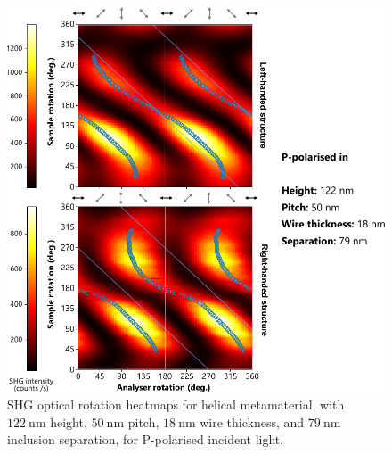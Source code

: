 \begin{figure}[htb!]	
    \centering	
    \includegraphics[scale=1]{./figures/results/OAinPlanarNanohelices/8_p_data.pdf}

    \caption{\label{fig:results:OAinPlanarNanohelices:8_p_data}
    SHG optical rotation heatmaps for helical metamaterial, with $\SI{122}{\nano\m}$ height, $\SI{50}{\nano\m}$ pitch, $\SI{18}{\nano\m}$ wire thickness, and $\SI{79}{\nano\m}$ inclusion separation, for P-polarised incident light.}	
\end{figure}
